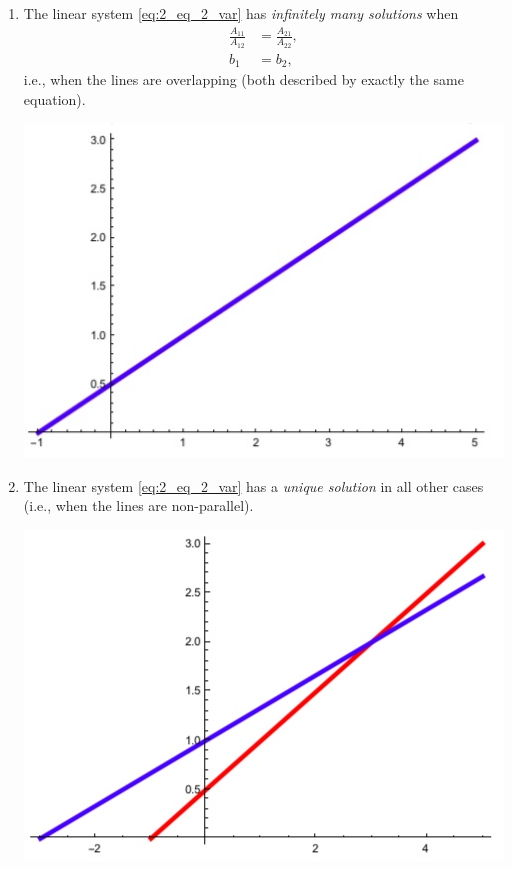 \documentclass[12pt,letterpaper,reqno]{article}
\numberwithin{equation}{section}
\begin{document}
\begin{example}
\begin{enumerate}[(1)]
\begin{center}
\end{center}

\item The linear system \eqref{eq:2_eq_2_var} has \emph{infinitely many solutions} when 
	\begin{align*}
		\frac{A_{11}}{A_{12}}&=\frac{A_{21}}{A_{22}}, \\
		b_1 & = b_2,
	\end{align*}
	i.e., when the lines are overlapping (both described by exactly the same equation).
	\begin{center}
	\includegraphics[scale=0.5]{figures_mvc/two_lines_inf_soln}		
	\end{center}

\item The linear system \eqref{eq:2_eq_2_var} has a \emph{unique solution} in all other cases (i.e., when the lines are non-parallel).
\begin{center}
\includegraphics[scale=0.5]{figures_mvc/two_lines_unique_soln}	
\end{center}
\end{enumerate}
\end{example}
\end{document}
